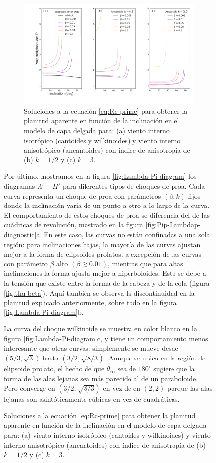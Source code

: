 \begin{figure}
\begin{figure}
  \centering
  \includegraphics[width=\linewidth]{./Figures/Pi-vs-i}
  \caption{Soluciones a la ecuación \ref{eq:Rc-prime} para obtener la planitud aparente en función de la inclinación en el modelo de capa delgada para: (a) viento interno isotrópico (cantoides y wilkinoides) y viento interno anisotrópico (ancantoides) con índice de anisotropía de (b) $k=1/2$ y (c) $k=3$.}
  \label{fig:Pi-vs-inclination}
\end{figure}

Por último, mostramos en la figura \ref{fig:Lambda-Pi-diagram} los diagramas $\Lambda'-\Pi'$ para diferentes tipos de choques de proa. Cada curva representa un choque de proa con parámetros $(\beta, k)$ fijos donde la inclinación varía de un punto a otro a lo largo de la curva. El comportamiento de estos choques de proa se diferencia del de las cuádricas de revolución, mostrado en la figura \ref{fig:Pip-Lambdap-diagnostic}a. En este caso, las curvas no están confinadas a una sola región: para inclinaciones bajas, la mayoría de las curvas ajustan mejor a la forma de elipsoides prolatos, a excepción de las curvas con parámetro $\beta$ alto $(\beta \gtrsim 0.01)$, mientras que para altas inclinaciones la forma ajusta mejor a hiperboloides. Esto se debe a la tensión que existe entre la forma de la cabeza y de la cola (figura \ref{fig:thq-beta}). Aquí también se observa la discontinuidad en la planitud explicado anteriormente, sobre todo en la figura \ref{fig:Lambda-Pi-diagram}b.

La curva del choque wilkinoide se muestra en color blanco en la figura \ref{fig:Lambda-Pi-diagram}c, y tiene un comportamiento menos interesante que otras curvas: simplemente se mueve desde $(5/3, \sqrt{3})$ hasta $(3/2, \sqrt{8/3})$. Aunque se ubica en la región de elipsoide prolato, el hecho de que $\theta_\infty$ sea de $180^\circ$ sugiere que la forma de las alas lejanas sea más parecido al de un paraboloide. Pero converge en $(3/2, \sqrt{8/3})$ en vez de en $(2, 2)$ porque las alas lejanas son asintóticamente cúbicas en vez de cuadráticas.


\end{figure}
